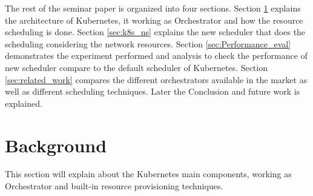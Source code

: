 The rest of the seminar paper is organized into four sections. Section \ref{sec:backgroud} explains the architecture of Kubernetes, it working as Orchestrator and how the resource scheduling is done. Section \ref{sec:k8s_ns} explains the new scheduler that does the scheduling considering the network resources. Section \ref{sec:Performance_eval} demonstrates the experiment performed and analysis to check the performance of new scheduler compare to the default scheduler of Kubernetes. Section \ref{sec:related_work} compares the different orchestrators available in the market as well as different scheduling techniques. Later the Conclusion and future work is explained.
\vspace{-0.10cm}
\section{Background}
\label{sec:backgroud}
This section will explain about the Kubernetes main components, working as Orchestrator and built-in resource provisioning techniques.
